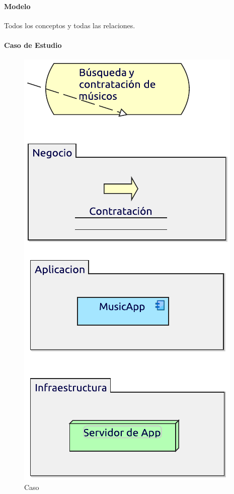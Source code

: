 \paragraph{Modelo}
Todos los conceptos y todas las relaciones.
\paragraph{Caso de Estudio}

\begin{figure}[h!]
	\centering
	\includegraphics[width=0.5\linewidth]{Desarrollo/ArquitecturaEmpresarial/Tecnologia/imgs/capas.pdf}
	\caption{Caso}
\end{figure}

\newpage